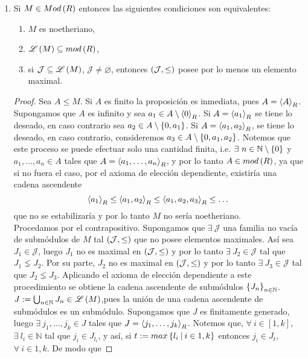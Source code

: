 \documentclass{article}
\begin{document}
\begin{enumerate}[label=\textbf{Ej \arabic*.}]
\begin{proof}
Ahora, si $g$ es supra, la sucesión \\$0\longrightarrow Ker(g) \stackrel{i}{\longrightarrow} M
 \stackrel{g}{\longrightarrow} Im(g)=M \longrightarrow 0$ es exacta, por lo que\\ $l(M)=l(M)+l(Ker(g))$, y como $l(M)$ es finita, entonces 
 $l(Ker(g))=0$, es decir, $Ker(g)=0$ entonces $g$ es inyectiva.
\end{proof}

\item Si $M\in Mod\left(R\right)$ entonces las siguientes condiciones son equivalentes:
\begin{enumerate}
	\item $M$ es noetheriano,
	\item $\mathscr{L}\left(M\right)\subseteq mod\left(R\right)$,
	\item si $\mathcal{J}\subseteq\mathscr{L}\left(M\right)$, $\mathcal{J}\neq\varnothing$, entonces $\left(\mathcal{J},\leq\right)$ posee por lo menos un elemento maximal.
\end{enumerate}
\begin{proof}
	 Sea $A\leq M$. Si $A$ es finito la proposición es inmediata, pues $A=\left< A\right>_{R}$. Supongamos que $A$ es infinito y sea  $a_1\in A\setminus\left< 0\right>_{R}$. Si $A=\left< a_1\right>_{R}$ se tiene lo deseado, en caso contrario sea $a_2\in A\setminus\left\{0,a_1\right\}$. Si $A=\left< a_1,a_2\right>_{R}$, se tiene lo deseado, en caso contrario, consideremos $a_3\in A\setminus\left\{0,a_1,a_2\right\}$. Notemos que este proceso se puede efectuar solo una cantidad finita, i.e. $\exists\ n\in\mathbb{N}\setminus\left\{0\right\}$ y $a_1,\dotsc,a_n\in A$ tales que $A=\left< a_1,\dotsc,a_n\right>_{R}$, y por lo tanto $A\in mod\left(R\right)$, ya que si no fuera el caso, por el axioma de elección dependiente, existiría una cadena ascendente
	\begin{equation*}
		\left< a_1\right>_{R}\leq \left< a_1,a_2\right>_{R}\leq \left< a_1,a_2,a_3\right>_{R}\leq\dots 
	\end{equation*}
que no se estabilizaría y por lo tanto $M$ no sería noetheriano.\\
 Procedamos por el contrapositivo. Supongamos que $\exists\ \mathcal{J}$ una familia no vacía de submódulos de $M$ tal $\left(\mathcal{J},\leq\right)$ que no posee elementos maximales. Así sea $J_1\in\mathcal{J}$, luego $J_1$ no es maximal en $\left(\mathcal{J},\leq\right)$ y por lo tanto $\exists\ J_2\in\mathcal{J}$ tal que $J_1\lneq J_2$. Por su parte, $J_2$ no es maximal en $\left(\mathcal{J},\leq\right)$ y por lo tanto $\exists\ J_3\in\mathcal{J}$ tal que $J_2\lneq J_3$. Aplicando el axioma de elección dependiente a este procedimiento se obtiene la cadena ascendente de submódulos ${\left\{{J}_{n}\right\}}_{n\in \mathbb{N}}$. $J:=\bigcup_{n\in\mathbb{N}}J_n\in\mathscr{L}\left(M\right)$,pues la unión de una cadena ascendente de submódulos es un submódulo. Supongamos que $J$ es finitamente generado, luego $\exists\ j_1,\dotsc,j_k\in J$ tales que $J=\left< j_1,\dotsc,j_k\right>_{R}$. Notemos que, $\forall\ i\in[1,k]$, $\exists\ l_i\in\mathbb{N}$ tal que $j_i\in J_{l_i}$, y así, si $t:=max\lrbrack{l_i\ \vline\ i\in{1,k}}$ entonces $j_i\in J_t$, $\forall\ i\in{1,k}$. De modo que

\end{proof}
\end{enumerate}
\end{document}
